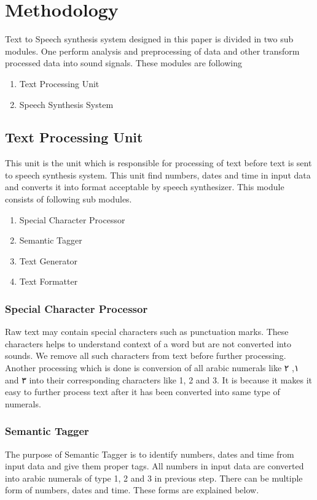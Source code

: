 \chapter{Methodology}

Text to Speech synthesis system designed in this paper is divided in two sub modules. One perform analysis and preprocessing of 
data and other transform processed data into sound signals. These modules are following

\begin{enumerate}
  \item Text Processing Unit
  \item Speech Synthesis System
\end{enumerate}

\section{Text Processing Unit}
This unit is the unit which is responsible for processing of text before text is sent to speech synthesis system. 
This unit find numbers, dates and time in input data and converts it into format acceptable by speech synthesizer.  
This module consists of following sub modules.

\begin{enumerate}
  \item Special Character Processor
  \item Semantic Tagger  
  \item Text Generator
  \item Text Formatter 
\end{enumerate}


\subsection{Special Character Processor}

Raw text may contain special characters such as punctuation marks. These characters helps to understand context of a word but 
are not converted into sounds. We remove all such characters from text before further processing. 
Another processing which is done is conversion of all arabic numerals like \textarabic{١}, \textarabic{٢} and \textarabic{٣} into their corresponding 
characters like 1, 2 and 3. It is because it makes it easy to further process text after it has been converted into same type of numerals.

\subsection{Semantic Tagger}
The purpose of Semantic Tagger is to identify numbers, dates and time from input data and give them proper tags. 
All numbers in input data are converted into arabic numerals of type 1, 2 and 3 in previous step. 
There can be multiple form of numbers, dates and time. These forms are explained below.


